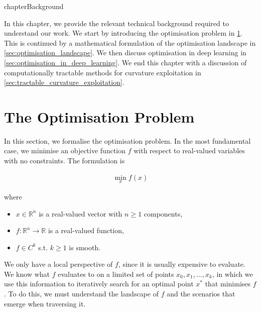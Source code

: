 chapter{Background}

\label{chap:background}



In this chapter, we provide the relevant technical background required to understand our work. We start by introducing the optimisation problem in \cref{sec:optimisation_problem}. This is continued by a mathematical formulation of the optimisation landscape in \cref{sec:optimisation_landscape}. We then discuss optimisation in deep learning in \cref{sec:optimisation_in_deep_learning}. We end this chapter with a discussion of computationally tractable methods for curvature exploitation in \cref{sec:tractable_curvature_exploitation}.



\section{The Optimisation Problem}

\label{sec:optimisation_problem}



In this section, we formalise the optimisation problem. In the most fundamental case, we minimise an objective function $f$ with respect to real-valued variables with no constraints. The formulation is 

\begin{align}

    \min_{x} f(x)

\end{align}

where

\begin{itemize}

    \item $x \in \mathbb{R}^n$ is a real-valued vector with $n \geq 1$ components,

    \item $f: \mathbb{R}^n \to \mathbb{R}$ is a real-valued function,

    \item $f \in C^k$ s.t. $k \geq 1$ is smooth.

\end{itemize}
We only have a local perspective of $f$, since it is usually expensive to evaluate. We know what $f$ evaluates to on a limited set of points $x_0, x_1, \ldots, x_k$, in which we use this information to iteratively search for an optimal point $x^*$ that minimises $f$. To do this, we must understand the landscape of $f$ and the scenarios that emerge when traversing it.



